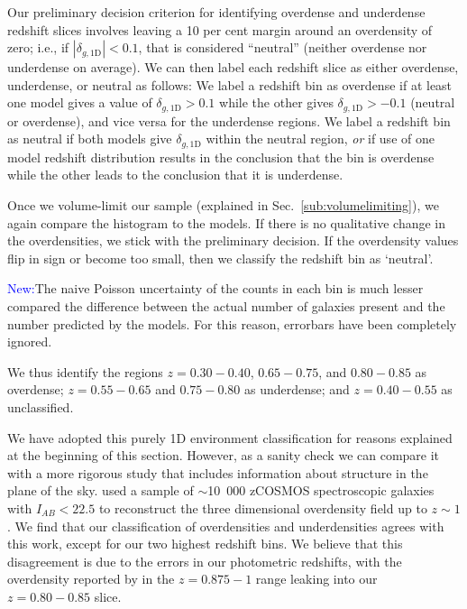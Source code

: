 \documentclass[twocolumn,useAMS,usenatbib]{mn2e}
\newcommand{\arun}[1]{{\textcolor{blue}{#1}}}
\begin{document}
Our preliminary decision criterion for identifying overdense and underdense
redshift slices involves leaving a 10 per cent margin around an
overdensity of zero; i.e., if $\left| \delta_{g,\text{1D}} \right| <
0.1$, that is considered ``neutral'' (neither overdense nor
underdense on average).  We can then label each redshift slice as
either overdense, underdense, or neutral as follows: 
We label a redshift bin as overdense if at least one model gives a
value of $\delta_{g,\text{1D}} > 0.1$ while the other gives
$\delta_{g,\text{1D}} > -0.1$ 
(neutral or overdense), and vice versa for the underdense regions. We
label a redshift bin as neutral if both models give
$\delta_{g,\text{1D}}$ within the neutral region,  
\emph{or} if use of one model redshift distribution results in the
conclusion that the bin is overdense while the other leads to the
conclusion that it is underdense. 

Once we volume-limit our sample (explained in Sec.~\ref{sub:volumelimiting}), we again compare the histogram to the models.
If there is no qualitative change in the overdensities, we stick with the preliminary decision. If the overdensity values
flip in sign or become too small, then we classify the redshift bin as `neutral'.

\arun{New:}The naive Poisson uncertainty of the counts
in each bin is much lesser compared the difference between the actual number of galaxies present
and the number predicted by the models. For this reason, errorbars have been completely ignored.

We thus identify the regions $z=0.30-0.40$, $0.65-0.75$, and
$0.80-0.85$ as overdense; $z=0.55-0.65$ and $0.75-0.80$ as underdense; and $z=0.40-0.55$ as unclassified. 

We have adopted this purely 1D environment classification for reasons
explained at the beginning of this section. However, as a sanity check
we can compare it with a more rigorous study that includes information
about structure in the plane of the sky.  
 \cite{Kovac_Density10k} used a sample of $\sim$10~000 zCOSMOS
 spectroscopic galaxies with $I_{AB}<22.5$ to reconstruct the three dimensional overdensity field up to $z\sim 1$.
We find that our classification of overdensities and underdensities
agrees with this work, except for our two highest redshift bins.
We believe that this disagreement is due to the errors in our
photometric redshifts, with the overdensity reported by
\cite{Kovac_Density10k} in the $z=0.875-1$ range 
leaking into our $z=0.80-0.85$ slice.
\end{document}
